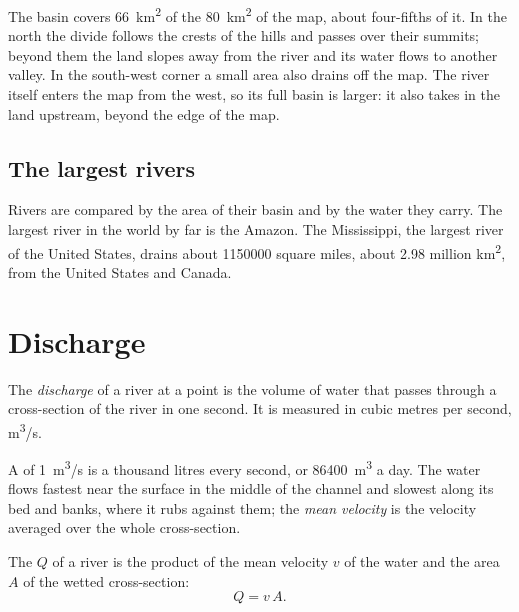 The basin covers \qty{66}{km^2} of the \qty{80}{km^2} of the map, about
four-fifths of it. In the north the divide follows the crests of the
hills and passes over their summits; beyond them the land slopes away from the river and its
water flows to another valley. In the south-west corner a small area also
drains off the map. The river itself enters the map from the west, so its
full basin is larger: it also takes in the land upstream, beyond the edge of
the map.

\subsection*{The largest rivers}

Rivers are compared by the area of their basin and by the water they carry.
The largest river in the world by far is the Amazon. The Mississippi, the
largest river of the United States, drains about \num{1150000} square miles,
about 2.98 million \unit{km^2}, from the United States and Canada.

\section{Discharge}

\begin{definition}[Discharge]\label{def:g10:drainage-basins:discharge}
The \emph{discharge} of a river at a point is the volume of
water that passes through a cross-section of the river in one second. It is
measured in cubic metres per second, \unit{m^3/s}.
\end{definition}

A  of \qty{1}{m^3/s} is a thousand litres every second, or
\qty{86400}{m^3} a day. The water flows fastest near the surface in the
middle of the channel and slowest along its bed and banks, where it rubs
against them; the \emph{mean velocity} is the velocity averaged over the
whole cross-section.

\begin{proposition}\label{prop:g10:drainage-basins:discharge}
The  $Q$ of a river is the product of the mean velocity $v$ of the
water and the area $A$ of the wetted cross-section:
\[
Q = v\,A.
\]
\end{proposition}

